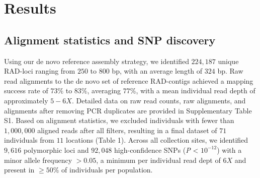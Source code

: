 \documentclass[9pt,a4paper,twoside]{rho-class/rho}
\begin{document}
\section{Results}

    \subsection{Alignment statistics and SNP discovery}

        Using our de novo reference assembly strategy, we identified $224,187$ unique RAD-loci ranging from $250$ to $800$ bp, with an average length of $324$ bp. Raw read alignments to the de novo set of reference RAD-contigs achieved a mapping success rate of $73\%$ to $83\%$, averaging $77\%$, with a mean individual read depth of approximately $5-6X$. Detailed data on raw read counts, raw alignments, and alignments after removing PCR duplicates are provided in Supplementary Table S1. Based on alignment statistics, we excluded individuals with fewer than $1,000,000$ aligned reads after all filters, resulting in a final dataset of $71$ individuals from $11$ locations (Table 1). Across all collection sites, we identified $9,616$ polymorphic loci and $92,048$ high-confidence SNPs (\textit{P} < $10^{-12}$) with a minor allele frequency $>0.05$, a minimum per individual read dept of $6X$ and present in $\geq50\%$ of individuals per population.
        
\begin{table}[!h]
    \small
    \captionsetup[table]{labelsep=space, 
        justification=raggedright, singlelinecheck=off}
    \caption{Altitude, coordinates, color category and samples sizes of \textit{I. rizeensis} used in this study.}
    \label{tab:my-table}
\end{table}
\end{document}
